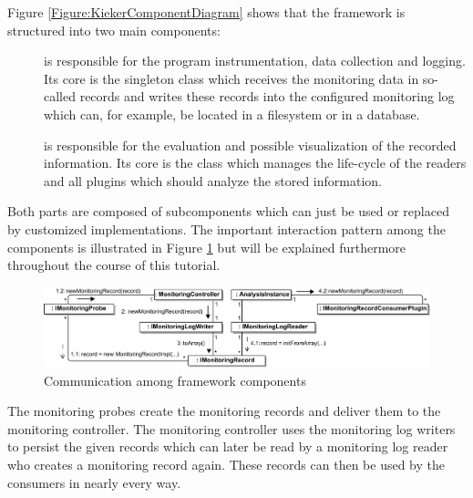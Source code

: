 \noindent Figure \ref{Figure:KiekerComponentDiagram} shows that the framework %
is structured into two main components:%
\begin{description}
\item[\KiekerMonitoringPart]
is responsible for the program instrumentation, data %
collection and logging.  Its core is the singleton class  %
which receives the monitoring data in so-called records and %
writes these records into the configured monitoring log which can, for example, %
be located in a filesystem or in a database.
\item[\KiekerAnalysisPart]
is responsible for the evaluation and possible visualization of the %
recorded information. Its core is the class  %
which manages the life-cycle of the readers and all plugins which should analyze %
the stored information.
\end{description}


\noindent Both parts are composed of subcomponents which can just be used or %
replaced by customized implementations. The important interaction pattern among %
the components is illustrated in Figure \ref{Figure:KiekerCommunicationDiagram} %
but will be explained furthermore throughout the course of this tutorial. %

\begin{figure}[H]\centering
\includegraphics[width=1\textwidth]{images/kiekerCommunications-revisedReArranged-woMonitoringLog-bw-newNames}
\caption{Communication among \Kieker{} framework components}
\label{Figure:KiekerCommunicationDiagram}
\end{figure}
		
\noindent The monitoring probes create the monitoring records and deliver %
them to the monitoring controller. The monitoring controller uses the monitoring %
log writers to persist the given records which can later be read by a monitoring %
log reader who creates a monitoring record again. These records can then be used %
by the consumers in nearly every way.


